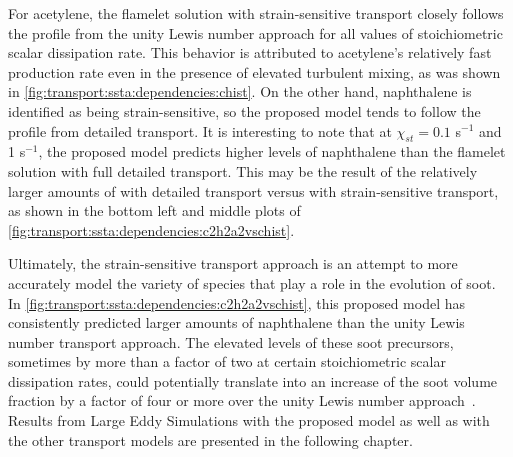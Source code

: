For acetylene, the flamelet solution with strain-sensitive transport closely follows the profile from the unity Lewis number approach for all values of stoichiometric scalar dissipation rate. This behavior is attributed to acetylene's relatively fast production rate even in the presence of elevated turbulent mixing, as was shown in \cref{fig:transport:ssta:dependencies:chist}. On the other hand, naphthalene is identified as being strain-sensitive, so the proposed model tends to follow the profile from detailed transport. It is interesting to note that at $\chi_{st} = 0.1$ s$^{-1}$ and 1 s$^{-1}$, the proposed model predicts higher levels of naphthalene than the flamelet solution with full detailed transport. This may be the result of the relatively larger amounts of  with detailed transport versus with strain-sensitive transport, as shown in the bottom left and middle plots of \cref{fig:transport:ssta:dependencies:c2h2a2vschist}.

Ultimately, the strain-sensitive transport approach is an attempt to more accurately model the variety of species that play a role in the evolution of soot. In \cref{fig:transport:ssta:dependencies:c2h2a2vschist}, this proposed model has consistently predicted larger amounts of naphthalene than the unity Lewis number transport approach. The elevated levels of these soot precursors, sometimes by more than a factor of two at certain stoichiometric scalar dissipation rates, could potentially translate into an increase of the soot volume fraction by a factor of four or more over the unity Lewis number approach~\cite{hmom2009}. Results from Large Eddy Simulations with the proposed model as well as with the other transport models are presented in the following chapter.
